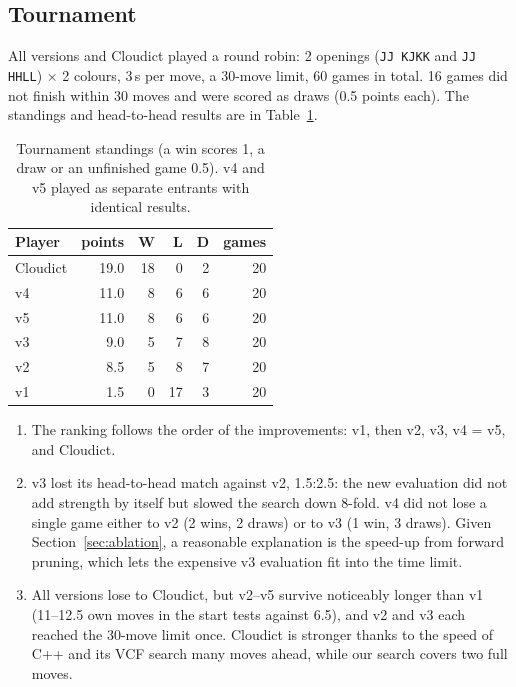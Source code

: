 \documentclass[a4paper,10pt,twocolumn]{article}
\newenvironment{points}{\begin{enumerate}[label=(\arabic*),leftmargin=*,itemsep=2pt,topsep=3pt]}{\end{enumerate}}
\newcommand{\code}[1]{\texttt{#1}}
\begin{document}
\subsection{Tournament}
All versions and Cloudict played a round robin: 2 openings (\code{JJ KJKK} and \code{JJ HHLL}) $\times$ 2 colours, 3\,s per move, a 30-move limit, 60 games in total. 16 games did not finish within 30 moves and were scored as draws (0.5 points each). The standings and head-to-head results are in Table~\ref{tab:tournament}.
\begin{table}[t]
\centering
\caption{Tournament standings (a win scores 1, a draw or an unfinished game 0.5). v4 and v5 played as separate entrants with identical results.}
\label{tab:tournament}
\begin{tabular}{@{}lrrrrr@{}}
\toprule
Player & points & W & L & D & games \\
\midrule
Cloudict & 19.0 & 18 & 0 & 2 & 20 \\
v4 & 11.0 & 8 & 6 & 6 & 20 \\
v5 & 11.0 & 8 & 6 & 6 & 20 \\
v3 & 9.0 & 5 & 7 & 8 & 20 \\
v2 & 8.5 & 5 & 8 & 7 & 20 \\
v1 & 1.5 & 0 & 17 & 3 & 20 \\
\bottomrule
\end{tabular}
\end{table}

\begin{points}
\item The ranking follows the order of the improvements: v1, then v2, v3, v4 = v5, and Cloudict.
\item v3 lost its head-to-head match against v2, 1.5:2.5: the new evaluation did not add strength by itself but slowed the search down 8-fold. v4 did not lose a single game either to v2 (2 wins, 2 draws) or to v3 (1 win, 3 draws). Given Section~\ref{sec:ablation}, a reasonable explanation is the speed-up from forward pruning, which lets the expensive v3 evaluation fit into the time limit.
\item All versions lose to Cloudict, but v2--v5 survive noticeably longer than v1 (11--12.5 own moves in the start tests against 6.5), and v2 and v3 each reached the 30-move limit once. Cloudict is stronger thanks to the speed of C++ and its VCF search many moves ahead, while our search covers two full moves.
\end{points}
\end{document}
